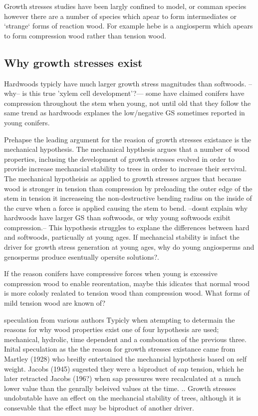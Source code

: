 \documentclass{article}
\begin{document}
Growth stresses studies have been largly confined to model, or comman species
however there are a number of species which apear to form intermediates or
`strange` forms of reaction wood. For example hebe is a angiosperm which apears
to form compression wood rather than tension wood.

\subsection{Why growth stresses exist}
Hardwoods typicly have much larger growth stress magnitudes than softwoods.
--why-- is this true 'xylem cell development'?--- some have claimed conifers
have compression throughout the stem when young, not until old that they follow
the same trend as hardwoods explanes the low/negative GS sometimes reported in
young conifers.

Prehapse the leading argument for the reasion of growth stresses existance is
the mechanical hypothesis. The mechanical hypthesis argues that a number of wood
properties, inclusing the development of growth stresses evolved in order to
provide increase mechancial stability to trees in order to increase their
servival. The mechanical hypotheisis as applied to growth stresses argues that
because wood is stronger in tension than compression by preloading the outer
edge of the stem in tension it increaseing the non-destructive bending radius on
the inside of the curve when a force is applied causing the stem to bend.
--dosnt explain why hardwoods have larger GS than softwoods, or why young
softwoods exibit compression.-- This hypothesis struggles to explane the
differences between hard and softwoods, particually at young ages. If mechancial
stability is infact the driver for growth stress generation at young ages, why
do young angiosperms and genosperms produce esentually opersite solutions?.

If the reason conifers have compressive forces when young is excessive
compression wood to enable reorentation, maybe this idicates that normal wood is
more colosly realated to tension wood than compression wood. What forms of mild
tension wood are known of?

speculation from various authors
Typicly when atempting to determain the reasons for why wood properties exist
one of four hypothesis are used; mechanical, hydrolic, time dependent and a
combonation of the previous three. Inital speculation as the the reason for
growth stresses existance came from Martley (1928) who breifly entertained the
mechancial hypothesis based on self weight. Jacobs (1945) sugested they were a
biproduct of sap tension, which he later retracted Jacobs (196?) when sap
pressures were recalculated at a much lower value than the genrally beleived
values at the time. .. Growth stresses undobutable have an effect on the
mechancial stability of trees, although it is consevable that the effect may be
biproduct of another driver.
\end{document}
